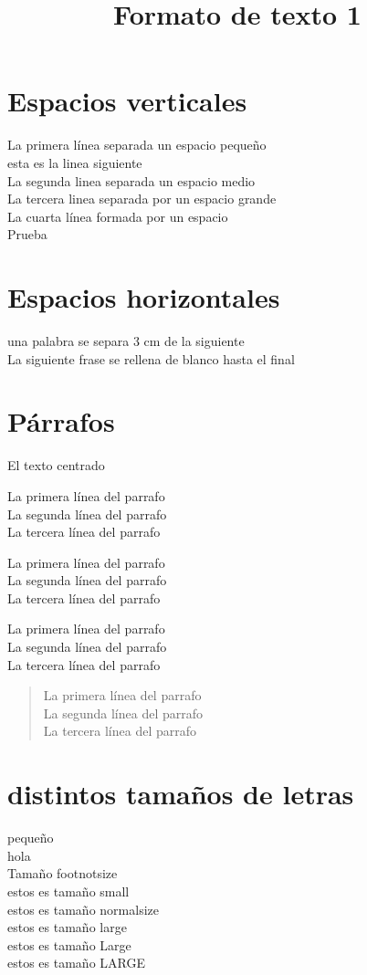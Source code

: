 \documentclass[10pt,a4paper]{article}
\title{Formato de texto 1}
\begin{document}
\section{Espacios verticales}
La primera línea separada un espacio pequeño
\smallskip \\
esta es la linea siguiente \\
La segunda linea separada un espacio medio
\medskip \\
La tercera linea separada por un espacio grande
\bigskip \\
La cuarta línea formada por un espacio
\vspace{99cm} \\
Prueba\\

\section{Espacios horizontales}
una palabra se separa 3 cm \hspace{3cm} de la siguiente\\
La siguiente frase se \hfill{rellena de blanco hasta el final}

\section{Párrafos}

El texto centrado
\begin{flushright}
La primera línea del parrafo \\
La segunda línea del parrafo \\
La tercera línea del parrafo \\ 
\end{flushright}
\begin{center}
La primera línea del parrafo \\
La segunda línea del parrafo \\
La tercera línea del parrafo \\ 
\end{center}
\begin{flushleft}
La primera línea del parrafo \\
La segunda línea del parrafo \\
La tercera línea del parrafo \\ 
\end{flushleft}
\begin{quote}
La primera línea del parrafo \\
La segunda línea del parrafo \\
La tercera línea del parrafo \\ 
\end{quote}

\section{distintos tamaños de letras}
\tiny pequeño \\
\scriptsize hola \\
\footnotesize Tamaño footnotsize \\
\small estos es tamaño small\\
\normalsize estos es tamaño normalsize \\
\large estos es tamaño large \\
\Large estos es tamaño Large \\
\LARGE estos es tamaño LARGE \\
\end{document}
